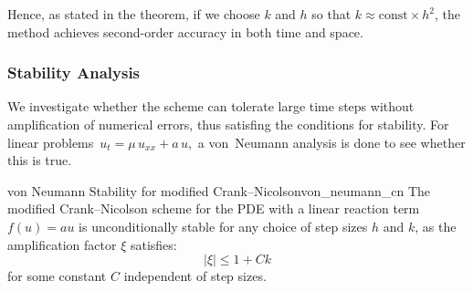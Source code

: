 Hence, as stated in the theorem, if we choose \(k\) and \(h\) so that \(k \approx \mathrm{const}\times h^2\),
the method achieves second-order accuracy in both time and space.

\subsubsection{Stability Analysis}

We investigate whether the scheme can tolerate large time steps without amplification of numerical errors, thus
satisfing the conditions for stability. 
For linear problems
\(\,u_t = \mu\,u_{xx} + a\,u,\) a von~Neumann analysis is done to see whether
this is true.

\begin{theorem}{von Neumann Stability for modified Crank--Nicolson}{von_neumann_cn}
    The modified Crank--Nicolson scheme for the PDE with a linear reaction term $f(u) = au$ is unconditionally 
    stable for any choice of step sizes $h$ and $k$, as the amplification factor $\xi$ satisfies:
    \[
      |\xi| \leq 1 + Ck
    \]
    for some constant $C$ independent of step sizes.
  \end{theorem}
  
